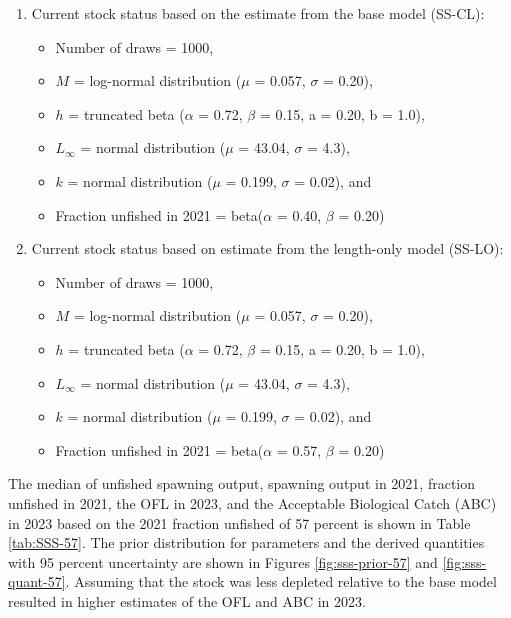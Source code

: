 \documentclass[11pt,
  english,
  letterpaper,
]{article}
\begin{document}
\leavevmode\tagmcend\tagstructend\par

\begin{enumerate}

    \item Current stock status based on the estimate from the base model (SS-CL):
    \begin{itemize}
        \item Number of draws = 1000,
        \item $M$ = log-normal distribution ($\mu$ = 0.057, $\sigma$ = 0.20),
        \item $h$ = truncated beta ($\alpha$ = 0.72, $\beta$ = 0.15, a = 0.20, b = 1.0),
        \item $L_{\infty}$ = normal distribution ($\mu$ = 43.04, $\sigma$ = 4.3),
        \item $k$ = normal distribution ($\mu$ = 0.199, $\sigma$ = 0.02), and
        \item Fraction unfished in 2021 = beta($\alpha$ = 0.40, $\beta$ = 0.20)
    \end{itemize}
    \item Current stock status based on estimate from the length-only model (SS-LO):
    \begin{itemize}
        \item Number of draws = 1000,
        \item $M$ = log-normal distribution ($\mu$ = 0.057, $\sigma$ = 0.20),
        \item $h$ = truncated beta ($\alpha$ = 0.72, $\beta$ = 0.15, a = 0.20, b = 1.0),
        \item $L_{\infty}$ = normal distribution ($\mu$ = 43.04, $\sigma$ = 4.3),
        \item $k$ = normal distribution ($\mu$ = 0.199, $\sigma$ = 0.02), and
        \item Fraction unfished in 2021 = beta($\alpha$ = 0.57, $\beta$ = 0.20)
    \end{itemize}
    
\end{enumerate}


The median of unfished spawning output, spawning output in 2021, fraction unfished in 2021, the OFL in 2023, and the Acceptable Biological Catch (ABC) in 2023 based on the 2021 fraction unfished of 57 percent is shown in Table \ref{tab:SSS-57}. The prior distribution for parameters and the derived quantities with 95 percent uncertainty are shown in Figures \ref{fig:sss-prior-57} and \ref{fig:sss-quant-57}. Assuming that the stock was less depleted relative to the base model resulted in higher estimates of the OFL and ABC in 2023.
\end{document}
